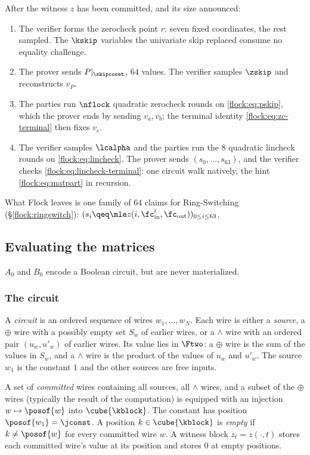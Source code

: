 \begin{protocol}\label{flock:protocol}
After the witness $z$ has been committed, and its size announced:
\begin{enumerate}
\item The verifier forms the zerocheck point $r$: seven fixed coordinates, the rest sampled. The $\kskip$ variables the univariate skip replaced consume no equality challenge.
\item The prover sends $P|_{\skipcoset}$, $64$ values. The verifier samples $\zskip$ and reconstructs $v_P$.
\item The parties run $\nflock$ quadratic zerocheck rounds on \eqref{flock:eq:pskip}, which the prover ends by sending $v_a,v_b$; the terminal identity \eqref{flock:eq:zc-terminal} then fixes $v_c$.
\item The verifier samples $\lcalpha$ and the parties run the $8$ quadratic lincheck rounds on \eqref{flock:eq:lincheck}. The prover sends $(s_0,\ldots,s_{63})$, and the verifier checks \eqref{flock:eq:lincheck-terminal}: one circuit walk natively, the hint \eqref{flock:eq:matpart} in recursion.
\end{enumerate}
What Flock leaves is one family of $64$ claims for Ring-Switching (\S\ref{flock:ringswitch}): $(s_i \qeq \mle z(i, \fc'_{\mathrm{in}},\fc_{\mathrm{out}}))_{0 \leq i \leq 63}$.
\end{protocol}

\subsection{Evaluating the matrices}\label{flock:matrices}

$A_0$ and $B_0$ encode a Boolean circuit, but are never materialized.

\subsubsection{The circuit}\label{flock:circuit}

\begin{definition}[Circuit]\label{def:circuit}
A \emph{circuit} is an ordered sequence of wires $w_1,\ldots,w_N$. Each wire is either a \emph{source}, a $\oplus$ wire with a possibly empty set $S_w$ of earlier wires, or a $\wedge$ wire with an ordered pair $(u_w,u'_w)$ of earlier wires. Its value lies in $\Ftwo$: a $\oplus$ wire is the sum of the values in $S_w$, and a $\wedge$ wire is the product of the values of $u_w$ and $u'_w$. The source $w_1$ is the constant $1$ and the other sources are free inputs.

A set of \emph{committed} wires containing all sources, all $\wedge$ wires, and a subset of the $\oplus$ wires (typically the result of the computation) is equipped with an injection $w\mapsto\posof{w}$ into $\cube{\kblock}$. The constant has position $\posof{w_1}=\jconst$. A position $k\in\cube{\kblock}$ is \emph{empty} if $k\neq\posof{w}$ for every committed wire $w$. A witness block $z_t=z(\cdot,t)$ stores each committed wire's value at its position and stores $0$ at empty positions.
\end{definition}


